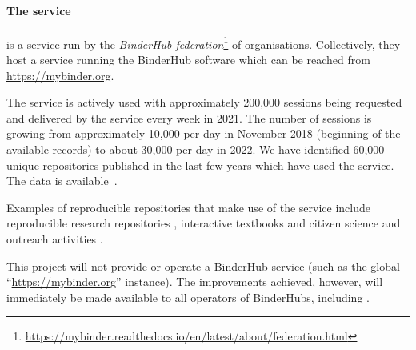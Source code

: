 \paragraph{The \mybinder{} service}\label{sec:mybinder}

\emph{\mybinder{}} is a service run by the \emph{BinderHub
  federation}\footnote{\url{https://mybinder.readthedocs.io/en/latest/about/federation.html}}
of organisations. Collectively, they host a service running the BinderHub software
which can be reached from \url{https://mybinder.org}.

The service is actively used with approximately 200,000 sessions being
requested and delivered by the \mybinder{} service every week in 2021. The number
of sessions is growing from approximately 10,000 per day in November 2018
(beginning of the available records) to about 30,000 per day in 2022. We have
identified 60,000 unique repositories published in the last few years which have
used the \mybinder{} service. The data is available~\cite{mybinder-archive}.

Examples of reproducible repositories that make use of the \mybinder service
include reproducible research repositories
\cite{GitHubRepoExampleAlbert2016,Beg2021}, interactive textbooks
\cite{Fangohr2022,Zeller2022} and citizen science and outreach activities
\cite{ligo-open-science,OSCOVIDA2022}.

This \TheProject{} project will not provide or operate a BinderHub service (such as the global
``\url{https://mybinder.org}'' instance). The improvements achieved, however, will immediately
be made available to all operators of BinderHubs, including \mybinder{}.







